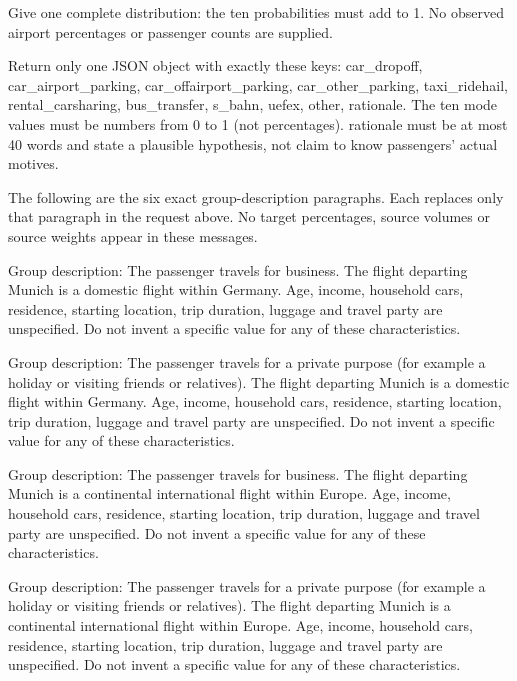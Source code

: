 \begin{promptbox}[title={Munich business / domestic group: full request}]
Give one complete distribution: the ten probabilities must add to 1. No observed airport percentages or passenger counts are supplied.

Return only one JSON object with exactly these keys: car\_dropoff, car\_airport\_parking, car\_offairport\_parking, car\_other\_parking, taxi\_ridehail, rental\_carsharing, bus\_transfer, s\_bahn, uefex, other, rationale. The ten mode values must be numbers from 0 to 1 (not percentages). rationale must be at most 40 words and state a plausible hypothesis, not claim to know passengers' actual motives.
\end{promptbox}


The following are the six exact group-description paragraphs. Each replaces only that paragraph in the request above. No target percentages, source volumes or source weights appear in these messages.

\begin{promptbox}[title={business / domestic}]
Group description: The passenger travels for business. The flight departing Munich is a domestic flight within Germany. Age, income, household cars, residence, starting location, trip duration, luggage and travel party are unspecified. Do not invent a specific value for any of these characteristics.
\end{promptbox}


\begin{promptbox}[title={private / domestic}]
Group description: The passenger travels for a private purpose (for example a holiday or visiting friends or relatives). The flight departing Munich is a domestic flight within Germany. Age, income, household cars, residence, starting location, trip duration, luggage and travel party are unspecified. Do not invent a specific value for any of these characteristics.
\end{promptbox}


\begin{promptbox}[title={business / continental}]
Group description: The passenger travels for business. The flight departing Munich is a continental international flight within Europe. Age, income, household cars, residence, starting location, trip duration, luggage and travel party are unspecified. Do not invent a specific value for any of these characteristics.
\end{promptbox}


\begin{promptbox}[title={private / continental}]
Group description: The passenger travels for a private purpose (for example a holiday or visiting friends or relatives). The flight departing Munich is a continental international flight within Europe. Age, income, household cars, residence, starting location, trip duration, luggage and travel party are unspecified. Do not invent a specific value for any of these characteristics.
\end{promptbox}


